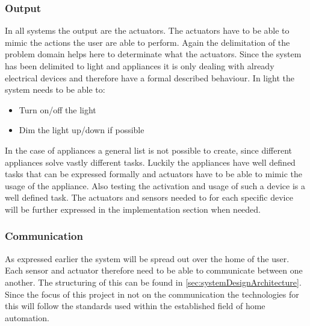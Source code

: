 \subsubsection{Output}
In all systems the output are the actuators. The actuators have to be able to mimic the actions the user are able to perform. Again the delimitation of the problem domain helps here to determinate what the actuators. Since the system has been delimited to light and appliances it is only dealing with already electrical devices and therefore have a formal described behaviour. In light the system needs to be able to:
\begin{itemize}
	\item Turn on/off the light
	\item Dim the light up/down if possible
\end{itemize}
In the case of appliances a general list is not possible to create, since different appliances solve vastly different tasks. Luckily the appliances have well defined tasks that can be expressed formally and actuators have to be able to mimic the usage of the appliance. Also testing the activation and usage of such a device is a well defined task. The actuators and sensors needed to for each specific device will be further expressed in the implementation section when needed.

\subsubsection{Communication}
As expressed earlier the system will be spread out over the home of the user. Each sensor and actuator therefore need to be able to communicate between one another. The structuring of this can be found in \cref{sec:systemDesignArchitecture}. Since the focus of this project in not on the communication the technologies for this will follow the standards used within the established field of home automation.
